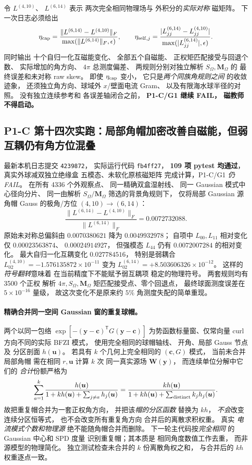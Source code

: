 令 $L^{(4,10)}$、
$L^{(6,14)}$ 表示
两次完全相同物理场与
外积分的\emph{实际对称}
磁矩阵。
下一次日志必须给出
\[
 \eta_{\rm cap}=
 \frac{\|L^{(6,14)}-L^{(4,10)}\|_F}
 {\max(\|L^{(6,14)}\|_F,\epsilon)},\qquad
 \eta_{{\rm self},j}=
 \frac{|L^{(6,14)}_{jj}-L^{(4,10)}_{jj}|}
 {\max(|L^{(6,14)}_{jj}|,\epsilon)}.
\]
同时输出
十个自归一化互磁能变化、
全部五个自磁能、
正权矩匹配接受与回退个数、
实际增加的角方向、
$4\pi$ 总测度偏差、
两规则分别对独立解析
$S_\Omega,\bm M_\Omega$ 的
最终误差和未对称 raw skew。
即使 $\eta_{\rm cap}$ 变小，
它只是\emph{两个同族角规则之间}
的收敛迹象，
还须独立角方向、球域外
$x$/壁面电流 Gram、
以及有限海水球半径的对照。
没有独立连续参考和
各误差轴闭合之前，
\textbf{P1-C/G1 继续 FAIL，
磁教师不得启动。}


\subsection{P1-C 第十四次实跑：局部角帽加密改善自磁能，但弱互耦仍有角方位混叠}
\label{sec:p1-c-source-cap-azimuth-phase}
最新本机日志提交 \texttt{4239872}，
实际运行代码 \texttt{fb4ff27}，
\textbf{109 项 pytest 均通过}，
真实外球减双独立绝缘盒
五模态、未软化原核磁矩阵
完成计算，P1-C/G1 \emph{仍 FAIL}。
在所有 4336 个外观察点、
同一精确双盒湿射线、
同一 Gaussian 模式中心径向分片、
同一由解析 $S_\Omega/\bm M_\Omega$
筛选的背景角规则下，
仅将局部 Gaussian 源角帽
Gauss 的极角/方位
$(4,10)\to(6,14)$：
\[
 \frac{\|L^{(6,14)}-L^{(4,10)}\|_F}
 {\|L^{(6,14)}\|_F}
 =0.0072732088.
\]
原始未对称总偏斜由
$0.0070380621$ 降为
$0.0049932978$；
自项中 $L_{00},L_{11}$
相对变化仅 $0.00023563874$、
$0.00024914927$，
但强模态 $L_{44}$ 仍有
$0.0072007284$ 的相对变化。
最大自归一化互耦变化
$0.027784516$，
特别是弱耦合
$L_{02}^{(4,10)}
=-1.576135872\times10^{-11}$
变为
$L_{02}^{(6,14)}
=+8.503606326\times10^{-12}$。
这样的\emph{符号翻转}意味着
在当前精度下不能赋予弱互耦项
稳定的物理符号。
两套规则均有 3500 个正权
解析 $4\pi,S_\Omega,\bm M_\Omega$
矩匹配接受点、零个回退点，
最终球面测度误差在
$5\times10^{-16}$ 量级，
故这次变化不是原来约 $5\%$
角测度失配的简单重现。

\paragraph{精确合并同一空间 Gaussian 窗的重复球帽。}
两个以同一包络
$\exp[-(\bm y-\bm c)^\mathsf TG(\bm y-\bm c)]$
为势函数标量窗、仅常向量
curl 方向不同的实际 BFZI 模式，
使用完全相同的球帽轴线、
开角、局部 Gauss 节点及
分区剖面 $h(\bm u)$。
若具有 $k$ 个几何上完全相同的
$(\bm c,G)$ 模式，
当前未合并局部角帽
需在相同 $r,\bm u$ 计算 $k$ 次
同一真实源场 $\bm W(\bm y)$，
而连续单位分解中它们的
\emph{合计}份额严格为
\[
 \sum_{a=1}^k
 \frac{h(\bm u)}
 {1+kh(\bm u)+\sum_{j\ne a}h_j(\bm u)}
 =\frac{kh(\bm u)}
 {1+kh(\bm u)+\sum_{\rm distinct}k_jh_j(\bm u)}.
\]
故把重复帽合并为一套正权角方向，
并把该\emph{帽的分区函数}
替换为 $kh$，
\emph{不会}改变连续分区恒等式，
也不会改变所有重复角方向
合并后的离散求积权重。
真实 \emph{电流模式个数和物理源}
绝不能随角帽合并而删除。
下一轮主代码按\emph{完全相同}
的 Gaussian 中心和 SPD 度量
识别重复帽；其本质是
相同角度数值工作去重，
而非源模型的物理简化。
独立测试检查未合并的
$k$ 份离散角权之和，
与合并后的 $kh$ 权重逐点一致。

